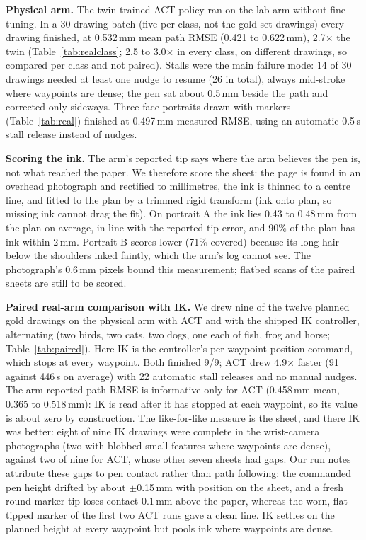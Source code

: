\documentclass[conference]{IEEEtran}
\newcommand{\mm}{\,mm\xspace}
\begin{document}
\textbf{Physical arm.} The twin-trained ACT policy ran on the lab arm without fine-tuning. In a 30-drawing batch
(five per class, not the gold-set drawings) every drawing finished, at 0.532\mm mean path RMSE
(0.421 to 0.622\mm), 2.7$\times$ the twin (Table~\ref{tab:realclass}; 2.5 to 3.0$\times$ in every class, on different drawings, so compared per class and not paired). Stalls were the main failure mode: 14 of
30 drawings needed at least one nudge to resume (26 in total), always mid-stroke where waypoints are dense; the pen
sat about 0.5\mm beside the path and corrected only sideways. Three face portraits drawn with markers
(Table~\ref{tab:real}) finished at 0.497\mm measured RMSE, using an automatic 0.5\,s stall release instead of
nudges.

\textbf{Scoring the ink.} The arm's reported tip says where the arm believes the pen is, not what reached the
paper. We therefore score the sheet: the page is found in an overhead photograph and rectified to millimetres, the
ink is thinned to a centre line, and fitted to the plan by a trimmed rigid transform (ink onto plan, so missing ink
cannot drag the fit). On portrait A the ink lies 0.43 to 0.48\mm from the plan on average, in line with the
reported tip error, and 90\% of the plan has ink within 2\mm. Portrait B scores lower (71\% covered) because its
long hair below the shoulders inked faintly, which the arm's log cannot see. The photograph's 0.6\mm pixels bound
this measurement; flatbed scans of the paired sheets are still to be scored.

\textbf{Paired real-arm comparison with IK.} We drew nine of the twelve planned gold drawings on the physical arm
with ACT and with the shipped IK controller, alternating (two birds, two cats, two dogs, one each of fish, frog and
horse; Table~\ref{tab:paired}). Here IK is the controller's per-waypoint position command, which stops at every
waypoint. Both finished 9/9; ACT drew 4.9$\times$ faster (91 against 446\,s on average) with 22 automatic stall
releases and no manual nudges. The arm-reported path RMSE is informative only for ACT (0.458\mm mean, 0.365 to
0.518\mm): IK is read after it has stopped at each waypoint, so its value is about zero by construction. The
like-for-like measure is the sheet, and there IK was better: eight of nine IK drawings were complete in the
wrist-camera photographs (two with blobbed small features where waypoints are dense), against two of nine for ACT,
whose other seven sheets had gaps. Our run notes attribute these gaps to pen contact rather than path following:
the commanded pen height drifted by about $\pm$0.15\mm with position on the sheet, and a fresh round marker tip
loses contact 0.1\mm above the paper, whereas the worn, flat-tipped marker of the first two ACT runs gave a clean
line. IK settles on the planned height at every waypoint but pools ink where waypoints are dense.
\end{document}
